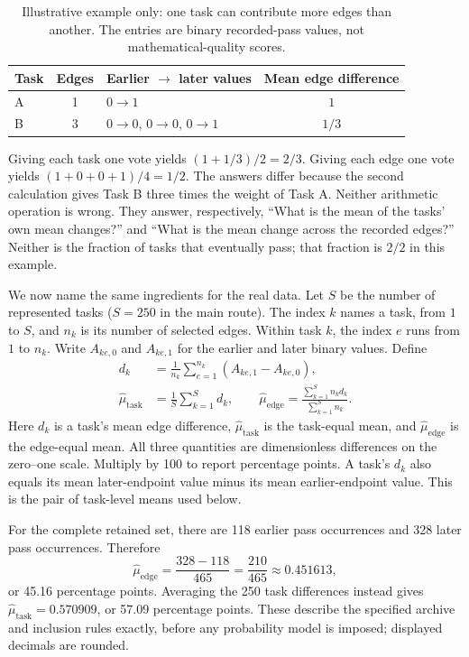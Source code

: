 \begin{table}[htbp]
\centering\small
\caption{Illustrative example only: one task can contribute more edges than another. The entries are binary recorded-pass values, not mathematical-quality scores.}
\label{tab:task-weights}
\begin{tabularx}{\linewidth}{l c Y c}
\toprule
Task & Edges & Earlier $\to$ later values & Mean edge difference \\
\midrule
A & 1 & $0\to1$ & $1$ \\
B & 3 & $0\to0$, $0\to0$, $0\to1$ & $1/3$ \\
\bottomrule
\end{tabularx}
\end{table}

Giving each task one vote yields $(1+1/3)/2=2/3$. Giving each edge one vote yields $(1+0+0+1)/4=1/2$. The answers differ because the second calculation gives Task B three times the weight of Task A. Neither arithmetic operation is wrong. They answer, respectively, ``What is the mean of the tasks' own mean changes?'' and ``What is the mean change across the recorded edges?'' Neither is the fraction of tasks that eventually pass; that fraction is $2/2$ in this example.

We now name the same ingredients for the real data. Let $S$ be the number of represented tasks ($S=250$ in the main route). The index $k$ names a task, from $1$ to $S$, and $n_k$ is its number of selected edges. Within task $k$, the index $e$ runs from $1$ to $n_k$. Write $A_{ke,0}$ and $A_{ke,1}$ for the earlier and later binary values. Define
\begin{equation}
\begin{split}
d_k&=\frac{1}{n_k}\sum_{e=1}^{n_k}(A_{ke,1}-A_{ke,0}),\\
\widehat\mu_{\mathrm{task}}&=\frac{1}{S}\sum_{k=1}^{S}d_k,
\qquad
\widehat\mu_{\mathrm{edge}}=\frac{\sum_{k=1}^{S}n_kd_k}{\sum_{k=1}^{S}n_k}.
\end{split}
\label{eq:paired-estimands}
\end{equation}
Here $d_k$ is a task's mean edge difference, $\widehat\mu_{\mathrm{task}}$ is the task-equal mean, and $\widehat\mu_{\mathrm{edge}}$ is the edge-equal mean. All three quantities are dimensionless differences on the zero--one scale. Multiply by 100 to report percentage points. A task's $d_k$ also equals its mean later-endpoint value minus its mean earlier-endpoint value. This is the pair of task-level means used below.

For the complete retained set, there are 118 earlier pass occurrences and 328 later pass occurrences. Therefore
\[
\widehat\mu_{\mathrm{edge}}=\frac{328-118}{465}
=\frac{210}{465}\approx0.451613,
\]
or 45.16 percentage points. Averaging the 250 task differences instead gives $\widehat\mu_{\mathrm{task}}=0.570909$, or 57.09 percentage points. These describe the specified archive and inclusion rules exactly, before any probability model is imposed; displayed decimals are rounded.


